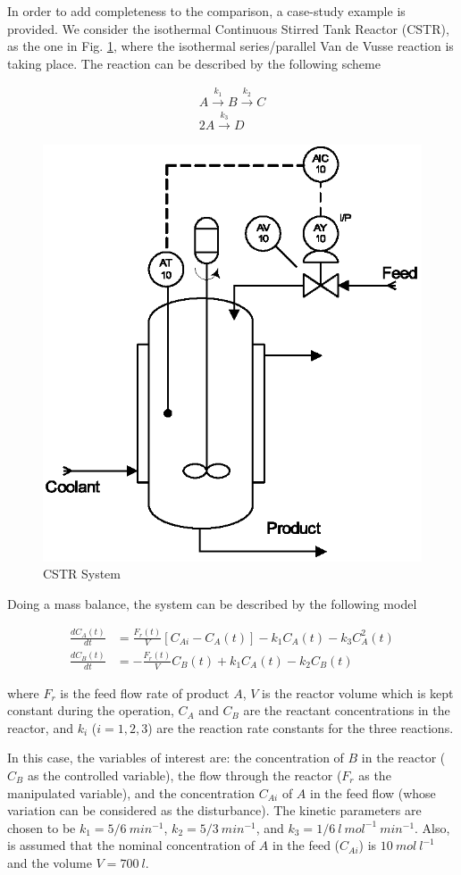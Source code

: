 In order to add completeness to the comparison, a case-study
example is provided. We consider the isothermal Continuous Stirred
Tank Reactor (CSTR), as the one in Fig. \ref{CSTR}, where the
isothermal series/parallel Van de Vusse reaction \cite{VandeVusse,
VandeVusse2} is taking place. The reaction can be described by the
following scheme

\begin{align}
    A \overset{k_1}{\longrightarrow} B \overset{k_2}{\longrightarrow}C\\
    2 A \overset{k_3}{\longrightarrow} D \nonumber
\end{align}

\begin{figure}[htb!]
\centering
\includegraphics[width=0.5\linewidth]{Reactor02.eps}
\caption{CSTR System} \label{CSTR}
\end{figure}

Doing a mass balance, the system can be described by the following
model

\begin{align}
    \frac{dC_A(t)}{dt} & = \frac{F_r(t)}{V} \left[C_{Ai}-C_A(t)\right] - k_1 C_A(t) - k_3 C^2_A(t) \nonumber \\
    \frac{dC_B(t)}{dt} & = -\frac{F_r(t)}{V} C_B(t)+ k_1 C_A(t) - k_2 C_B(t)
    \label{system3}
\end{align}

\noindent where $F_r$ is the feed flow rate of product $A$, $V$ is
the reactor volume which is kept constant during the operation,
$C_A$ and $C_B$ are the reactant concentrations in the reactor,
and $k_i$ ($i=1,2,3$) are the reaction rate constants for the
three reactions.

In this case, the variables of interest are: the concentration of
$B$ in the reactor ($C_B$ as the controlled variable), the flow
through the reactor ($F_r$ as the manipulated variable), and the
concentration $C_{Ai}$ of $A$ in the feed flow (whose variation
can be considered as the disturbance). The kinetic parameters are
chosen to be $k_1 = 5/6 \ min^{-1}$, $k_2 = 5/3 \ min^{-1}$, and
$k_3 = 1/6 \ l \ mol^{-1} \ min^{-1}$. Also, is assumed that the
nominal concentration of $A$ in the feed ($C_{Ai}$) is $10 \ mol \
l^{-1}$ and the volume $V = 700 \ l$.

